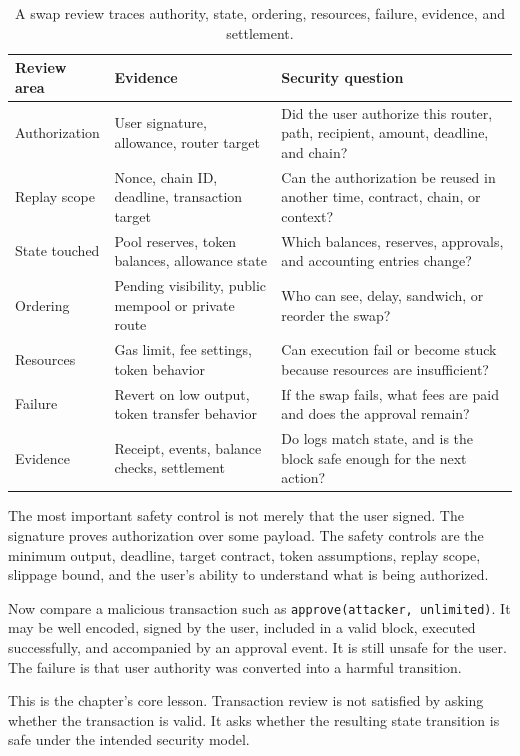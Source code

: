 \begin{table}[htbp]
\centering
\small
\renewcommand{\arraystretch}{1.18}
\begin{tabularx}{\textwidth}{@{}>{\RaggedRight\arraybackslash}p{}>{\RaggedRight\arraybackslash}p{}X@{}}
\toprule
Review area & Evidence & Security question \\
\midrule
Authorization & User signature, allowance, router target & Did the user authorize this router, path, recipient, amount, deadline, and chain? \\
Replay scope & Nonce, chain ID, deadline, transaction target & Can the authorization be reused in another time, contract, chain, or context? \\
State touched & Pool reserves, token balances, allowance state & Which balances, reserves, approvals, and accounting entries change? \\
Ordering & Pending visibility, public mempool or private route & Who can see, delay, sandwich, or reorder the swap? \\
Resources & Gas limit, fee settings, token behavior & Can execution fail or become stuck because resources are insufficient? \\
Failure & Revert on low output, token transfer behavior & If the swap fails, what fees are paid and does the approval remain? \\
Evidence & Receipt, events, balance checks, settlement & Do logs match state, and is the block safe enough for the next action? \\
\bottomrule
\end{tabularx}
\caption{A swap review traces authority, state, ordering, resources, failure, evidence, and settlement.}
\end{table}

The most important safety control is not merely that the user signed. The signature proves authorization over some payload. The safety controls are the minimum output, deadline, target contract, token assumptions, replay scope, slippage bound, and the user's ability to understand what is being authorized.

Now compare a malicious transaction such as \texttt{approve(attacker, unlimited)}. It may be well encoded, signed by the user, included in a valid block, executed successfully, and accompanied by an approval event. It is still unsafe for the user. The failure is that user authority was converted into a harmful transition.

This is the chapter's core lesson. Transaction review is not satisfied by asking whether the transaction is valid. It asks whether the resulting state transition is safe under the intended security model.

